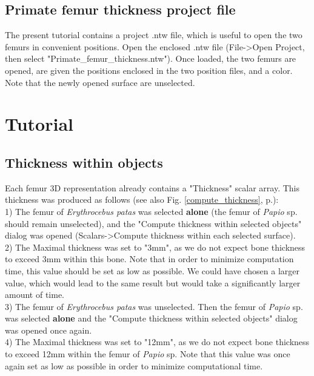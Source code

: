 \documentclass[12pt, a4paper]{book}
\begin{document}
\subsection{Primate femur thickness project file}
The present tutorial contains a project .ntw file, which is useful to open the two femurs
 in convenient positions. Open the enclosed .ntw file (File->Open Project, then select
"Primate\_femur\_thickness.ntw"). Once loaded, the two femurs are opened, are given the positions
enclosed in the two position files, and a color. Note that the newly opened
surface are unselected.


\section{Tutorial}

\subsection{Thickness within objects}
Each femur 3D representation already contains a "Thickness" scalar array. This thickness was produced as follows (see also Fig. \ref{compute_thickness}, p.\pageref{compute_thickness}): \\
1) The femur of \textit{Erythrocebus patas} was selected \textbf{alone} (the femur of \textit{Papio} sp. should remain unselected), and the "Compute thickness within selected objects" dialog was opened (Scalars->Compute thickness within each selected surface). \\
2) The Maximal thickness was set to "3mm", as we do not expect bone thickness to exceed 3mm within this bone. Note that in order to minimize computation time, this value should be set as low as possible. We could have chosen a larger value, which would lead to the same result but would take a significantly larger amount of time.\\
3) The femur of \textit{Erythrocebus patas} was unselected. Then the femur of \textit{Papio} sp. was selected \textbf{alone} and the "Compute thickness within selected objects" dialog was opened once again. \\
4) The Maximal thickness was set to "12mm", as we do not expect bone thickness to exceed 12mm within the femur of \textit{Papio} sp. Note that this value was once again set as low as possible in order to minimize computational time.\\
\end{document}
